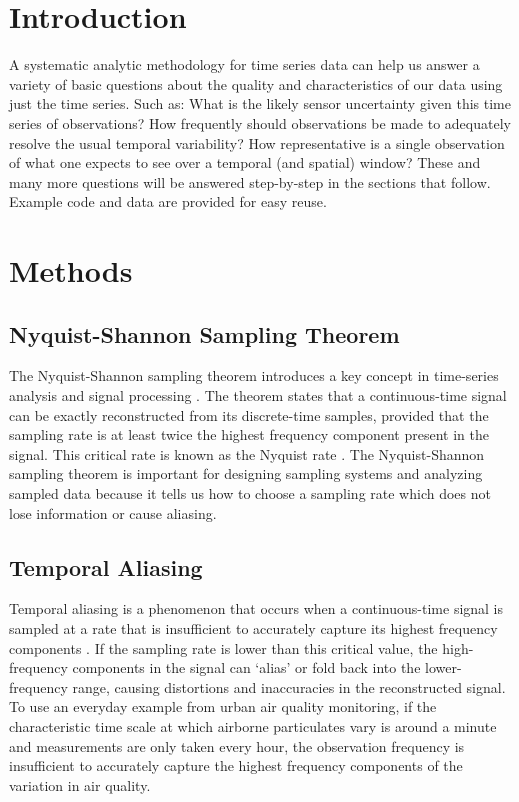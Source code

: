 \documentclass[sensors,article,submit,moreauthors,pdftex]{Definitions/mdpi}
\begin{document}
\section{Introduction}

\noindent A systematic analytic methodology for time series data can help us answer a variety of basic questions about the quality and characteristics of our data using just the time series. Such as: What is the likely sensor uncertainty given this time series of observations? How frequently should observations be made to adequately resolve the usual temporal variability? How representative is a single observation of what one expects to see over a temporal (and spatial) window? These and many more questions will be answered step-by-step in the sections that follow. Example code and data are provided for easy reuse.

\section{Methods}

\vspace{0.1in}

\subsection{Nyquist-Shannon Sampling Theorem}

The Nyquist-Shannon sampling theorem introduces a key concept in time-series analysis and signal processing \cite{nyquist1928certain, shannon1949communication, oppenheim1999discrete}. The theorem states that a continuous-time signal can be exactly reconstructed from its discrete-time samples, provided that the sampling rate is at least twice the highest frequency component present in the signal. This critical rate is known as the Nyquist rate \citep{stoelinga2019weather, wilks2019statistical}. The Nyquist-Shannon sampling theorem is important for designing sampling systems and analyzing sampled data because it tells us how to choose a sampling rate which does not lose information or cause aliasing.

\subsection{Temporal Aliasing}

Temporal aliasing is a phenomenon that occurs when a continuous-time signal is sampled at a rate that is insufficient to accurately capture its highest frequency components \citep{nyquist1928certain, shannon1949communication, oppenheim1999discrete, bracewell2000fourier}. If the sampling rate is lower than this critical value, the high-frequency components in the signal can \lq alias' or fold back into the lower-frequency range, causing distortions and inaccuracies in the reconstructed signal. To use an everyday example from urban air quality monitoring, if the characteristic time scale at which airborne particulates vary is around a minute and measurements are only taken every hour, the observation frequency is insufficient to accurately capture the highest frequency components of the variation in air quality.
\end{document}
